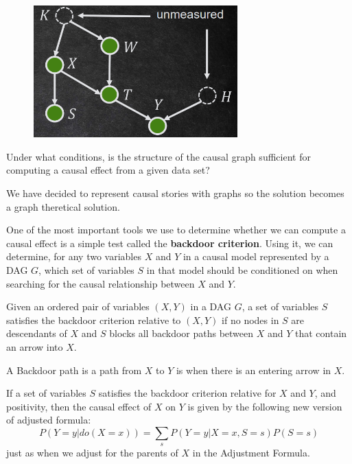 \begin{figure}[h]
      \centering
      \includegraphics*[width=0.7\textwidth]{img/unmeasured_parents.png}
\end{figure}

\begin{center}
      Under what conditions, is the structure of the causal graph sufficient for
      computing a causal effect from a given data set?
\end{center}

We have decided to represent causal stories with graphs so the solution becomes a graph theretical 
solution.

One of the most important tools we use to determine whether we can compute a
causal effect is a simple test called the \textbf{backdoor criterion}. Using it,
we can determine, for any two variables $X$ and $Y$ in a causal model represented
by a DAG $G$, which set of variables $S$ in that model should be conditioned on
when searching for the causal relationship between $X$ and $Y$.

\begin{definition}
      Given an ordered pair of variables $(X, Y)$ in a DAG $G$, a set of variables
      $S$ satisfies the backdoor criterion relative to $(X, Y)$ if no nodes
      in $S$ are descendants of $X$ and $S$ blocks all backdoor paths between $X$
      and $Y$ that contain an arrow into $X$.

\end{definition}
\begin{definition}
      A Backdoor path is a path from $X$ to $Y$ is when there is an entering arrow in $X$.
\end{definition}

\begin{definition}
      
      If a set of variables $S$ satisfies the backdoor criterion relative for $X$ and
      $Y$, and positivity, then the causal effect of $X$ on $Y$ is given by the following new version 
      of adjusted formula:
      \begin{equation}
            P(Y = y| do(X = x)) = \sum_{s} P(Y = y| X = x, S = s)P(S = s)
      \end{equation}
      just as when we adjust for the parents of $X$ in the Adjustment Formula. 
\end{definition}


